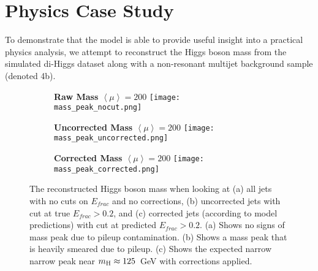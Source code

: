 \section{Physics Case Study}\hfill

To demonstrate that the model is able to provide useful insight into a practical physics analysis, we attempt to reconstruct the Higgs boson mass from the simulated di-Higgs dataset along with a non-resonant multijet background sample (denoted 4b). 

\begin{figure}[ht]
\centering
\begin{subfigure}{.32\textwidth}
  \centering
  \textbf{\tiny{Raw Mass $\left \langle \mu \right \rangle=200$}}
  \texttt{[image: mass\_peak\_nocut.png]}
  \caption{}
  \label{fig:Raw}
\end{subfigure}
\begin{subfigure}{.32\textwidth}
  \centering
  \textbf{\tiny{Uncorrected Mass $\left \langle \mu \right \rangle=200$}}
  \texttt{[image: mass\_peak\_uncorrected.png]}
  \caption{}
  \label{fig:Uncorrected}
\end{subfigure}
\begin{subfigure}{.32\textwidth}
  \centering
  \textbf{\tiny{Corrected Mass $\left \langle \mu \right \rangle=200$}}
  \texttt{[image: mass\_peak\_corrected.png]}
  \caption{}
  \label{fig:Corrected}
\end{subfigure}
\caption{The reconstructed Higgs boson mass when looking at (a) all jets with no cuts on $E_{frac}$ and no corrections, (b) uncorrected jets with cut at true $E_{frac}>0.2$, and (c) corrected jets (according to model predictions) with cut at predicted $E_{frac}>0.2$. (a) Shows no signs of mass peak due to pileup contamination. (b) Shows a mass peak that is heavily smeared due to pileup. (c) Shows the expected narrow narrow peak near $m_{\rm H}\approx 125$~GeV with corrections applied.}
\label{fig:MassPeak}
\end{figure}

